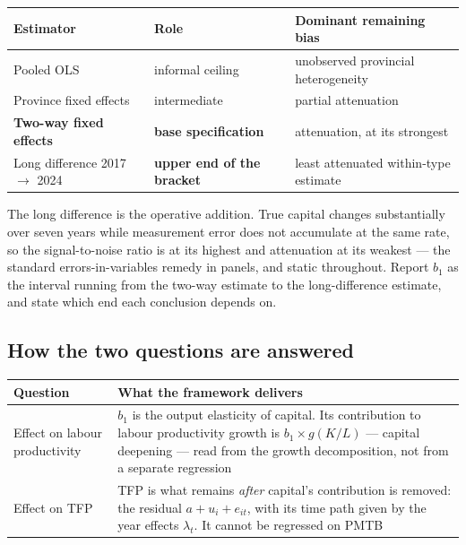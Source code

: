 \documentclass[11pt,a4paper]{article}
\begin{document}
\begin{center}
\small
\begin{tabular}{@{}p{4.4cm}p{4.6cm}p{5.8cm}@{}}
\toprule
\textbf{Estimator} & \textbf{Role} & \textbf{Dominant remaining bias} \\
\midrule
Pooled OLS & informal ceiling & unobserved provincial heterogeneity \\
Province fixed effects & intermediate & partial attenuation \\
\textbf{Two-way fixed effects} & \textbf{base specification} & attenuation, at its strongest \\
Long difference 2017 $\to$ 2024 & \textbf{upper end of the bracket} & least attenuated within-type estimate \\
\bottomrule
\end{tabular}
\end{center}

The long difference is the operative addition. True capital changes substantially over seven
years while measurement error does not accumulate at the same rate, so the signal-to-noise ratio
is at its highest and attenuation at its weakest --- the standard errors-in-variables remedy in
panels, and static throughout. Report $b_1$ as the interval running from the two-way estimate to
the long-difference estimate, and state which end each conclusion depends on.

\subsection*{How the two questions are answered}

\begin{center}
\small
\begin{tabular}{@{}p{3.5cm}p{11.6cm}@{}}
\toprule
\textbf{Question} & \textbf{What the framework delivers} \\
\midrule
Effect on labour productivity &
$b_1$ is the output elasticity of capital. Its contribution to labour productivity growth is
$b_1 \times g(K/L)$ --- capital deepening --- read from the growth decomposition, not from a
separate regression \\
Effect on TFP &
TFP is what remains \emph{after} capital's contribution is removed: the residual
$a + u_i + e_{it}$, with its time path given by the year effects $\lambda_t$. It cannot be
regressed on PMTB \\
\bottomrule
\end{tabular}
\end{center}
\end{document}

